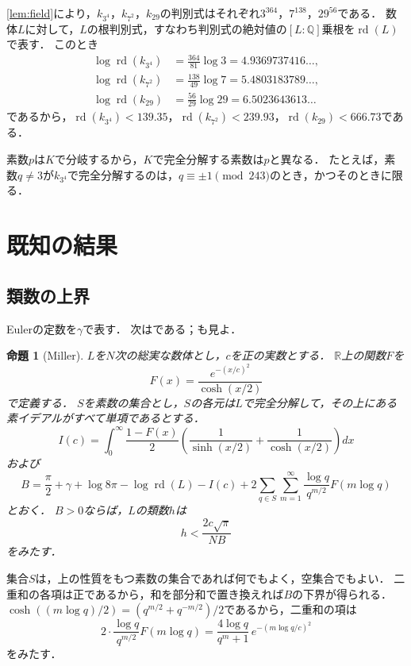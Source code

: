 \documentclass[11pt,a4paper]{ltjsarticle}
\theoremstyle{ja}
\newtheorem{proposition}[theorem]{命題}
\begin{document}
\cref{lem:field}により，$k_{3^4}$，$k_{7^2}$，$k_{29}$の判別式はそれぞれ$3^{364}$，$7^{138}$，$29^{56}$である．
数体$L$に対して，$L$の根判別式，すなわち判別式の絶対値の$[L : \mathbb{Q}]$乗根を$\operatorname{rd}(L)$で表す．
このとき
\begin{align*}
\log \operatorname{rd}(k_{3^4}) &= \tfrac{364}{81} \log 3 = 4.9369737416\ldots, \\
\log \operatorname{rd}(k_{7^2}) &= \tfrac{138}{49} \log 7 = 5.4803183789\ldots, \\
\log \operatorname{rd}(k_{29}) &= \tfrac{56}{29} \log 29 = 6.5023643613\ldots
\end{align*}
であるから，$\operatorname{rd}(k_{3^4}) < 139.35$，$\operatorname{rd}(k_{7^2}) < 239.93$，$\operatorname{rd}(k_{29}) < 666.73$である．

素数$p$は$K$で分岐するから，$K$で完全分解する素数は$p$と異なる．
たとえば，素数$q \ne 3$が$k_{3^4}$で完全分解するのは，$q \equiv \pm 1 \pmod{243}$のとき，かつそのときに限る．

\section{既知の結果} \label{sec:known}

\subsection{類数の上界}

Eulerの定数を$\gamma$で表す．
次は\cite[Lemma 5.1]{Mi14}である；\cite[Lemma 1]{Mi15b}も見よ．

\begin{proposition}[Miller] \label{prop:miller}
$L$を$N$次の総実な数体とし，$c$を正の実数とする．
$\mathbb{R}$上の関数$F$を
\[
F(x) = \frac{e^{-(x/c)^2}}{\cosh(x/2)}
\]
で定義する．
$S$を素数の集合とし，$S$の各元は$L$で完全分解して，その上にある素イデアルがすべて単項であるとする．
\[
I(c) = \int_0^\infty \frac{1 - F(x)}{2} \left( \frac{1}{\sinh(x/2)} + \frac{1}{\cosh(x/2)} \right) dx
\]
および
\[
B = \frac{\pi}{2} + \gamma + \log 8\pi - \log \operatorname{rd}(L) - I(c) + 2 \sum_{q \in S} \sum_{m=1}^{\infty} \frac{\log q}{q^{m/2}} F(m \log q)
\]
とおく．
$B > 0$ならば，$L$の類数$h$は
\[
h < \frac{2c\sqrt{\pi}}{N B}
\]
をみたす．
\end{proposition}

集合$S$は，上の性質をもつ素数の集合であれば何でもよく，空集合でもよい．
二重和の各項は正であるから，和を部分和で置き換えれば$B$の下界が得られる．
$\cosh((m \log q)/2) = (q^{m/2} + q^{-m/2})/2$であるから，二重和の項は
\begin{equation} \label{eq:term}
2 \cdot \frac{\log q}{q^{m/2}} F(m \log q) = \frac{4 \log q}{q^m + 1} \, e^{-(m \log q/c)^2}
\end{equation}
をみたす．
\end{document}

